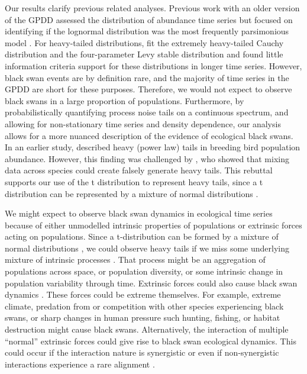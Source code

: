 Our results clarify previous related analyses. Previous work with an older
version of the GPDD assessed the distribution of abundance time series but
focused on identifying if the lognormal distribution was the most frequently
parsimonious model \citep{halley2002}. For heavy-tailed distributions,
\citet{halley2002} fit the extremely heavy-tailed Cauchy distribution and the
four-parameter Levy stable distribution and found little information criteria
support for these distributions in longer time series. However, black swan
events are by definition rare, and the majority of time series in the GPDD are
short for these purposes. Therefore, we would not expect to observe black swans
in a large proportion of populations. Furthermore, by probabilistically
quantifying process noise tails on a continuous spectrum, and allowing
for non-stationary time series and density dependence, our analysis allows for
a more nuanced description of the evidence of ecological black swans. In an
earlier study, \citet{keitt1998} described heavy (power law) tails in breeding
bird population abundance. However, this finding was challenged by
\citet{allen2001}, who showed that mixing data across species could create
falsely generate heavy tails. This rebuttal supports our use of the
t distribution to represent heavy tails, since a t distribution can be
represented by a mixture of normal distributions \citep[with
inverse-gamma-distributed variances,][]{gelman2014}.

We might expect to observe black swan dynamics in ecological time series
because of either unmodelled intrinsic properties of populations or extrinsic
forces acting on populations. Since a t-distribution can be formed by a mixture
of normal distributions \citep{gelman2014}, we could observe heavy tails if we
miss some underlying mixture of intrinsic processes \citep{allen2001}. That
process might be an aggregation of populations across space, or population
diversity, or some intrinsic change in population variability through time.
Extrinsic forces could also cause black swan dynamics
\citep[e.g.][]{nunez2012}. These forces could be extreme themselves. For
example, extreme climate, predation from or competition with other species
experiencing black swans, or sharp changes in human pressure such hunting,
fishing, or habitat destruction might cause black swans. Alternatively, the
interaction of multiple ``normal'' extrinsic forces could give rise to black
swan ecological dynamics. This could occur if the interaction nature is
synergistic \citep[e.g.][]{kirby2009} or even if non-synergistic interactions
experience a rare alignment \citep{denny2009}.

